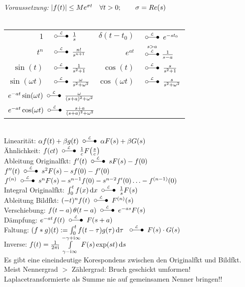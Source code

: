 \documentclass[german,color]{latex4ei/latex4ei_fs}
\begin{document}
\begin{sectionbox}
		\\
	\emph{Voraussetzung:} $\left\vert f(t)\right\vert \leq M e^{\sigma t} \quad \forall t > 0; \qquad \sigma = Re(s)$\\
	\\
	\everymath{\displaystyle}	%
	\begin{tabular}{rl|rl}
		$1$ & \!\!\!\!\!\!\!\!\!\!$\LT \frac{1}{s}$ & $\delta(t-t_0)$ & \!\!\!\!\!\!\!\!\!\!$\LT e^{-s t_0}$\\[0.2em]
		$t^n$ & \!\!\!\!\!\!\!\!\!\!$\LT \frac{n!}{s^{n+1}}$ & $e^{at}$  & \!\!\!\!\!\!\!\!\!\!$\overset{s > a}{ \LT } \frac{1}{s-a}$\\[0.5em] 
		$\sin(t)$ & \!\!\!\!\!\!\!\!\!\!$\LT \frac{1}{s^2 + 1}$ & $\cos(t)$ & \!\!\!\!\!\!\!\!\!\!$\LT \frac{s}{s^2 + 1}$\\[0.5em]
		$\sin(\omega t)$ & \!\!\!\!\!\!\!\!\!\!$\LT \frac{\omega}{s^2 + \omega^2}$ & $\cos(\omega t)$ & \!\!\!\!\!\!\!\!\!\!$\LT \frac{s}{s^2 + \omega^2}$\\[0.5em]
		\multicolumn{4}{l}{ $e^{-at} \sin(\omega t) \LT \frac{\omega}{(s+a)^2+\omega^2}$} \\
		\multicolumn{4}{l}{ $e^{-at} \cos(\omega t) \LT \frac{s+a}{(s+a)^2+\omega^2}$}\\ 		
		
	\end{tabular}\\
	\everymath{\textstyle}
	Linearität: $\alpha f(t) + \beta g(t) \LT \alpha F(s) + \beta G(s)$\\
	Ähnlichkeit: $f(ct) \LT \frac{1}{c} F\bigl(  \frac{s}{c} \bigr)$\\
	Ableitung Originalfkt: $f'(t) \LT s F(s) - f(0)$ \quad $f''(t) \LT s^2 F(s) - sf(0) - f'(0)$\\
	$f^{(n)} \LT s^n F(s) - s^{n-1} f(0) - s^{n-2} f'(0) \ldots - f^{(n-1)}(0)$\\
	Integral Originalfkt: $\int_0^t f(x) \diff x \LT \frac{1}{s} F(s)$\\
	Ableitung Bildfkt: $(-t)^n f(t) \LT F^{(n)} (s)$\\
	Verschiebung: $f(t-a)\heavi(t-a) \LT e^{-as} F(s)$\\
	Dämpfung: $e^{-at} f(t) \LT F(s+a)$\\
	Faltung: $(f * g)(t) := \int_0^t f( t - \tau) g(\tau) \diff \tau$ $\LT F(s) \cdot G(s)$\\
	Inverse: $f(t) = \frac{1}{2\pi \i} \int\limits_{\gamma - \i \infty}^{-\gamma + \i \infty} F(s) \exp(st) \diff s$\\
	Es gibt eine eineindeutige Korespondens zwischen den Originalfkt und Bildfkt.
	Meist Nennergrad $>$ Zählergrad: Bruch geschickt umformen!
	Laplacetransformierte als Summe nie auf gemeinsamen Nenner bringen!!
\end{sectionbox}
\end{document}

